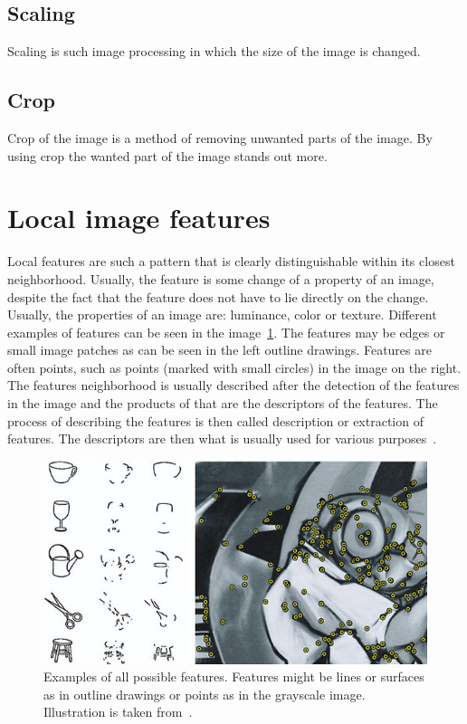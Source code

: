 \documentclass[thesis=B,english]{FITthesis}[2019/12/23]
\begin{document}
        \subsection{Scaling}
            Scaling is such image processing in which the size of the image is changed.

        \subsection{Crop}
            Crop of the image is a method of removing unwanted parts of the image. By using crop the wanted part of the image stands out more.
        
    \section{Local image features}
        Local features are such a pattern that is clearly distinguishable within its closest neighborhood. Usually, the feature is some change of a property of an image, despite the fact that the feature does not have to lie directly on the change. Usually, the properties of an image are: luminance, color or texture. Different examples of features can be seen in the image~\ref{fig:localFeaturesExamples}. The features may be edges or small image patches as can be seen in the left outline drawings. Features are often points, such as points (marked with small circles) in the image on the right. The features neighborhood is usually described after the detection of the features in the image and the products of that are the descriptors of the features. The process of describing the features is then called  description or extraction of features. The descriptors are then what is usually used for various purposes~\cite{Mikolajczyk2015}.
        
        \begin{figure}
            \centering
            \includegraphics[width = 0.8\linewidth]{pictures/localFeaturesExamples.jpeg}
            \caption[Examples of all possible features]{Examples of all possible features. Features might be lines or surfaces as in outline drawings or points as in the grayscale image. Illustration is taken from~\cite{Mikolajczyk2015}.}
            \label{fig:localFeaturesExamples}
        \end{figure}
        
\end{document}
